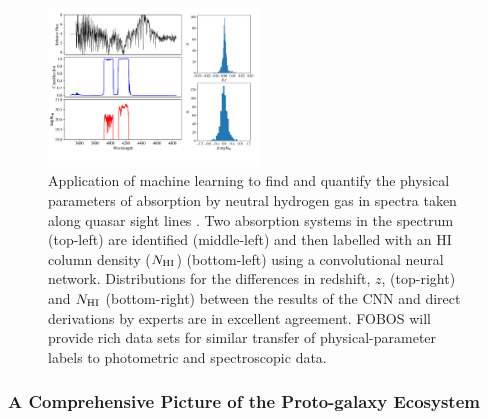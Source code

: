 \documentclass[oneside,11pt]{amsart}
\begin{document}
\begin{figure}\small
%
\includegraphics[width=0.5\textwidth]{figs/Parks_fig.pdf}
%
\caption{Application of machine learning to find and quantify the
physical parameters of absorption by neutral hydrogen gas in spectra
taken along quasar sight lines \citep[adapted from Figs 7 and 14
from][]{parks18}.  Two absorption systems in the spectrum (top-left) are
identified (middle-left) and then labelled with an HI column density
($N_{\rm HI}$) (bottom-left) using a convolutional neural network.
Distributions for the differences in redshift, $z$, (top-right) and
$N_{\rm HI}$ (bottom-right) between the results of the CNN and direct
derivations by experts are in excellent agreement.  FOBOS will provide
rich data sets for similar transfer of physical-parameter labels to
photometric and spectroscopic data.}
%
\label{fig:absorber}
%
\end{figure}

\subsubsection{A Comprehensive Picture of the Proto-galaxy Ecosystem}
\label{sec:galaxies}

%
%
%
%
\end{document}
